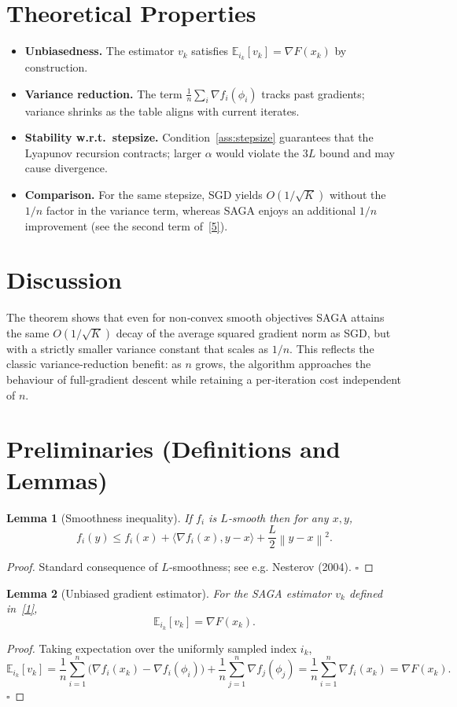 \documentclass[11pt]{article}
\newtheorem{lemma}{Lemma}
\newcommand{\E}{\mathbb{E}}
\newcommand{\norm}[1]{\left\|#1\right\|}
\newcommand{\inner}[2]{\langle #1,#2\rangle}
\newcommand{\grad}{\nabla}
\begin{document}
\section*{Theoretical Properties}
\begin{itemize}
\item \textbf{Unbiasedness.} The estimator $v_k$ satisfies $\E_{i_k}[v_k]=\grad F(x_k)$ by construction.
\item \textbf{Variance reduction.} The term $\frac1n\sum_i\grad f_i(\phi_i)$ tracks past gradients; variance shrinks as the table aligns with current iterates.
\item \textbf{Stability w.r.t.\ stepsize.} Condition~\ref{ass:stepsize} guarantees that the Lyapunov recursion contracts; larger $\alpha$ would violate the $3L$ bound and may cause divergence.
\item \textbf{Comparison.} For the same stepsize, SGD yields $O(1/\sqrt{K})$ without the $1/n$ factor in the variance term, whereas SAGA enjoys an additional $1/n$ improvement (see the second term of~\eqref{5}).
\end{itemize}

\section*{Discussion}
The theorem shows that even for non‑convex smooth objectives SAGA attains the same $O(1/\sqrt{K})$ decay of the average squared gradient norm as SGD, but with a strictly smaller variance constant that scales as $1/n$. This reflects the classic variance‑reduction benefit: as $n$ grows, the algorithm approaches the behaviour of full‑gradient descent while retaining a per‑iteration cost independent of $n$.

\newpage
\section*{Preliminaries (Definitions and Lemmas)}
\begin{lemma}[Smoothness inequality]\label{lem:smooth}
If $f_i$ is $L$‑smooth then for any $x,y$,
\[
f_i(y)\le f_i(x)+\inner{\grad f_i(x)}{y-x}
      +\frac{L}{2}\norm{y-x}^{2}.
\tag{L1}
\]
\end{lemma}
\begin{proof}
Standard consequence of $L$‑smoothness; see e.g. Nesterov (2004). \hfill $\square$
\end{proof}

\begin{lemma}[Unbiased gradient estimator]\label{lem:unbiased}
For the SAGA estimator $v_k$ defined in~\eqref{1},
\[
\E_{i_k}[v_k]=\grad F(x_k).
\tag{L2}
\]
\end{lemma}
\begin{proof}
Taking expectation over the uniformly sampled index $i_k$,
\[
\E_{i_k}[v_k]
= \frac1n\sum_{i=1}^{n}\bigl(\grad f_i(x_k)-\grad f_i(\phi_i)\bigr)
   +\frac1n\sum_{j=1}^{n}\grad f_j(\phi_j)
 = \frac1n\sum_{i=1}^{n}\grad f_i(x_k)=\grad F(x_k).
\] \hfill $\square$
\end{proof}
\end{document}
